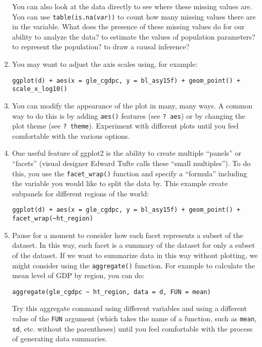 \documentclass[a4paper,12pt]{article}
\begin{document}
\begin{enumerate}
\noindent You can also look at the data directly to see where these missing values are. You can use \texttt{table(is.na(\textit{var}))} to count how many missing values there are in the variable. What does the presence of these missing values do for our ability to analyze the data? to estimate the values of population parameters? to represent the population? to draw a causal inference?

\item You may want to adjust the axis scales using, for example:

\begin{verbatim}
ggplot(d) + aes(x = gle_cgdpc, y = bl_asy15f) + geom_point() + scale_x_log10()
\end{verbatim}

\item You can modify the appearance of the plot in many, many ways. A common way to do this is by adding \texttt{aes()} features (see \texttt{? aes}) or by changing the plot theme (see \texttt{? theme}). Experiment with different plots until you feel comfortable with the various options.

\item One useful feature of ggplot2 is the ability to create multiple ``panels'' or ``facets'' (visual designer Edward Tufte calls these ``small multiples''). To do this, you use the \texttt{facet\_wrap()} function and specify a ``formula'' including the variable you would like to split the data by. This example create subpanels for different regions of the world:

\begin{verbatim}
ggplot(d) + aes(x = gle_cgdpc, y = bl_asy15f) + geom_point() + facet_wrap(~ht_region)
\end{verbatim}

\item Pause for a moment to consider how each facet represents a subset of the dataset. In this way, each facet is a summary of the dataset for only a subset of the dataset. If we want to summarize data in this way without plotting, we might consider using the \texttt{aggregate()} function. For example to calculate the mean level of GDP by region, you can do:

\begin{verbatim}
aggregate(gle_cgdpc ~ ht_region, data = d, FUN = mean)
\end{verbatim}

\noindent Try this aggregate command using different variables and using a different value of the \texttt{FUN} argument (which takes the name of a function, such as \texttt{mean}, \texttt{sd}, etc. without the parentheses) until you feel comfortable with the process of generating data summaries.



\end{enumerate}
\end{document}

